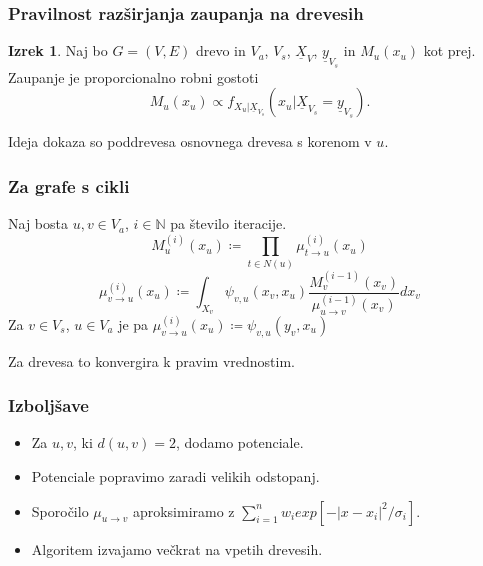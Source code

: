 \documentclass{beamer}
\renewcommand{\vec}{\underline}
\theoremstyle{definition}
\newtheorem{izrek}{Izrek}
\begin{document}
	\begin{frame}
		\frametitle{Pravilnost razširjanja zaupanja na drevesih}
		\begin{izrek}
			Naj bo $G = \left(V, E\right)$ drevo in $V_a$, $V_s$, $\vec{X}_V$,
			$\vec{y}_{V_s}$ in $M_u\left(x_u\right)$ kot prej.
			Zaupanje je proporcionalno robni gostoti
			$$
			M_u\left(x_u\right) \propto f_{X_u | \vec{X}_{V_s}}\left(x_u | \vec{X}_{V_s} = \vec{y}_{V_s}\right).
			$$
		\end{izrek}
		Ideja dokaza so poddrevesa osnovnega drevesa s korenom v $u$.
	\end{frame}

	\begin{frame}
		\frametitle{Za grafe s cikli}
		Naj bosta $u,v \in V_a$, $i \in \mathbb{N}$ pa število iteracije.
		$$
		M_u^{\left(i\right)}\left(x_u\right) \coloneqq
		\prod_{t \in N\left(u\right)}\mu^{\left(i\right)}_{t \to u}\left(x_u\right)
		$$
		$$
		\mu_{v \to u}^{\left(i\right)}\left(x_u\right) \coloneqq
		\int_{X_v} \psi_{v,u}\left(x_v,x_u\right)
		\frac{
			M_v^{\left(i-1\right)}\left(x_v\right)}{
			\mu_{u \to v}^{\left(i-1\right)}\left(x_v\right)
		}dx_v
		$$
		Za $v \in V_s$, $u \in V_a$ je pa
		$\mu_{v \to u}^{\left(i\right)}\left(x_u\right) \coloneqq \psi_{v,u}\left(y_v, x_u\right)$

		Za drevesa to konvergira k pravim vrednostim.
	\end{frame}

  \begin{frame}
    \frametitle{Izboljšave}
    \begin{itemize}
      \item Za $u,v$, ki $d\left(u,v\right) = 2$, dodamo potenciale.
      \item Potenciale popravimo zaradi velikih odstopanj.
      \item Sporočilo $\mu_{u \to v}$ aproksimiramo z
        $\sum_{i=1}^{n}w_i exp\left[-\left|x-x_i\right|^2/\sigma_i\right]$.
      \item Algoritem izvajamo večkrat na vpetih drevesih.
    \end{itemize}
  \end{frame}
\end{document}
